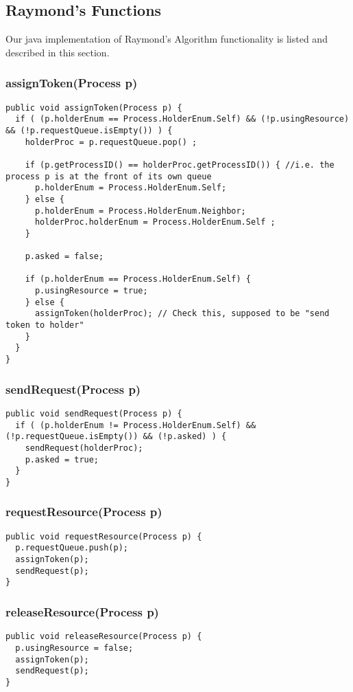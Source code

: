 \documentclass{article}
\begin{document}
	\subsection{Raymond's Functions}
	\label{subsec:RaymondsFunctions}
	Our java implementation of Raymond's Algorithm functionality is listed and described in this section.
		\subsubsection{assignToken(Process p)}
		\begin{lstlisting}
public void assignToken(Process p) {
  if ( (p.holderEnum == Process.HolderEnum.Self) && (!p.usingResource) && (!p.requestQueue.isEmpty()) ) {
    holderProc = p.requestQueue.pop() ;

    if (p.getProcessID() == holderProc.getProcessID()) { //i.e. the process p is at the front of its own queue
      p.holderEnum = Process.HolderEnum.Self;
    } else {
      p.holderEnum = Process.HolderEnum.Neighbor;
      holderProc.holderEnum = Process.HolderEnum.Self ;
    }
	
    p.asked = false;
	
    if (p.holderEnum == Process.HolderEnum.Self) {
      p.usingResource = true;
    } else {
      assignToken(holderProc); // Check this, supposed to be "send token to holder"
    }
  }
}
		\end{lstlisting}
		
		\subsubsection{sendRequest(Process p)}
		\begin{lstlisting}
public void sendRequest(Process p) {
  if ( (p.holderEnum != Process.HolderEnum.Self) && (!p.requestQueue.isEmpty()) && (!p.asked) ) {
    sendRequest(holderProc);
    p.asked = true;
  }
}
		\end{lstlisting}
		\subsubsection{requestResource(Process p)}
		\begin{lstlisting}
public void requestResource(Process p) {
  p.requestQueue.push(p);
  assignToken(p);
  sendRequest(p);
}
		\end{lstlisting}
		
		\subsubsection{releaseResource(Process p)}
		\begin{lstlisting}
public void releaseResource(Process p) {
  p.usingResource = false;
  assignToken(p);
  sendRequest(p);
}
		\end{lstlisting}
		
\end{document}
